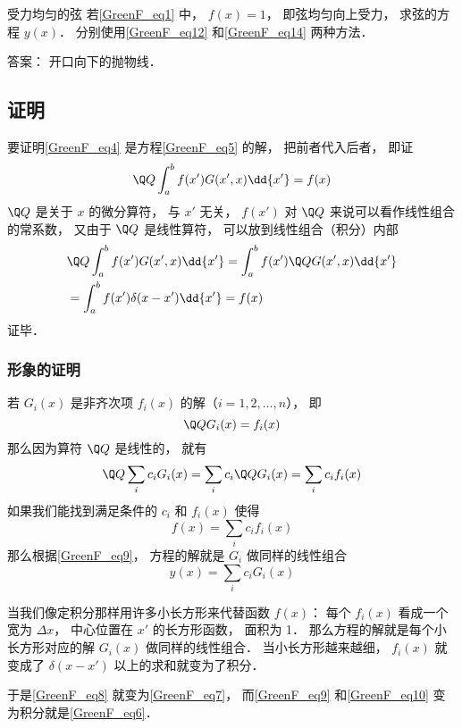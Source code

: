 \begin{exercise}{受力均匀的弦}
若\autoref{GreenF_eq1} 中， $f(x) = 1$， 即弦均匀向上受力， 求弦的方程 $y(x)$． 分别使用\autoref{GreenF_eq12} 和\autoref{GreenF_eq14} 两种方法．

答案： 开口向下的抛物线．
\end{exercise}

\subsection{证明}
要证明\autoref{GreenF_eq4} 是方程\autoref{GreenF_eq5} 的解， 把前者代入后者， 即证
\begin{equation}
\Q Q \int_a^b f(x') G(x', x) \dd{x'} = f(x)
\end{equation}
$\Q Q$ 是关于 $x$ 的微分算符， 与 $x'$ 无关， $f(x')$ 对 $\Q Q$ 来说可以看作线性组合的常系数， 又由于 $\Q Q$ 是线性算符， 可以放到线性组合（积分）内部
\begin{equation}\label{GreenF_eq6}
\begin{aligned}
&\Q Q \int_a^b f(x') G(x', x) \dd{x'} = \int_a^b f(x') \Q QG(x', x)\dd{x'}\\
&= \int_a^b f(x') \delta(x - x') \dd{x'} = f(x)
\end{aligned}
\end{equation}
证毕．

\subsubsection{形象的证明}
若 $G_i(x)$ 是非齐次项 $f_i(x)$ 的解（$i = 1,2,\dots, n$）， 即
\begin{equation}\label{GreenF_eq8}
\Q Q G_i(x) = f_i(x)
\end{equation}
那么因为算符 $\Q Q$ 是线性的， 就有
\begin{equation}\label{GreenF_eq9}
\Q Q\sum_i c_i G_i(x) = \sum_i c_i \Q Q G_i(x) = \sum_i c_i f_i(x)
\end{equation}
如果我们能找到满足条件的 $c_i$ 和 $f_i(x)$ 使得
\begin{equation}\label{GreenF_eq10}
f(x) = \sum_i c_i f_i(x)
\end{equation}
那么根据\autoref{GreenF_eq9}， 方程的解就是 $G_i$ 做同样的线性组合
\begin{equation}
y(x) = \sum_i c_i G_i(x)
\end{equation}

当我们像定积分那样用许多小长方形来代替函数 $f(x)$： 每个 $f_i(x)$ 看成一个宽为 $\Delta x$， 中心位置在 $x'$ 的长方形函数， 面积为 1． 那么方程的解就是每个小长方形对应的解 $G_i(x)$ 做同样的线性组合． 当小长方形越来越细， $f_i(x)$ 就变成了 $\delta(x - x')$ 以上的求和就变为了积分．

于是\autoref{GreenF_eq8} 就变为\autoref{GreenF_eq7}， 而\autoref{GreenF_eq9} 和\autoref{GreenF_eq10} 变为积分就是\autoref{GreenF_eq6}． 

